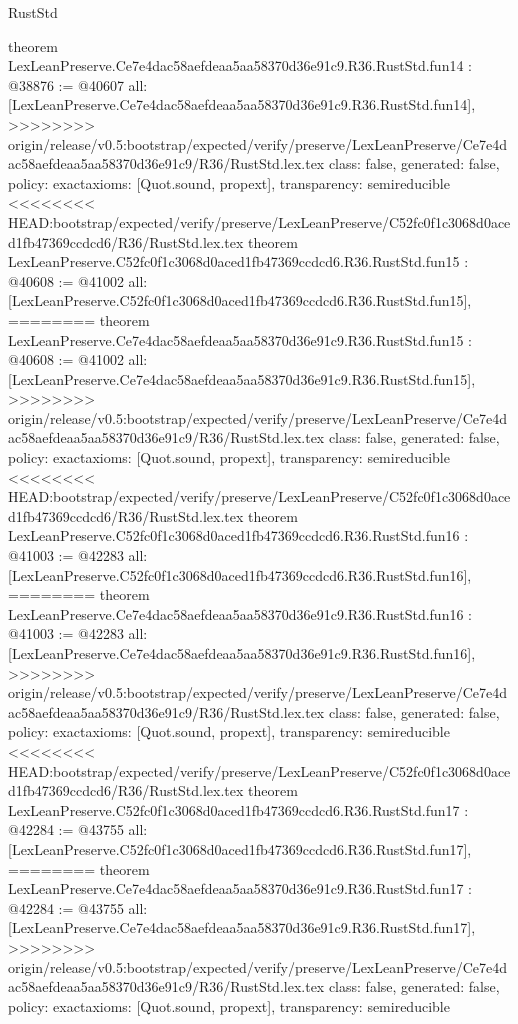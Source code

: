 \begin{lexlean}{RustStd}
\begin{coremodule}
{\begin{coremodule}
{{{{{{{{{{{{{{{{{theorem LexLeanPreserve.Ce7e4dac58aefdeaa5aa58370d36e91c9.R36.RustStd.fun14 : @38876 := @40607 {
  all: [LexLeanPreserve.Ce7e4dac58aefdeaa5aa58370d36e91c9.R36.RustStd.fun14],
>>>>>>>> origin/release/v0.5:bootstrap/expected/verify/preserve/LexLeanPreserve/Ce7e4dac58aefdeaa5aa58370d36e91c9/R36/RustStd.lex.tex
  class: false,
  generated: false,
  policy: exact{axioms: [Quot.sound, propext]},
  transparency: semireducible
}
<<<<<<<< HEAD:bootstrap/expected/verify/preserve/LexLeanPreserve/C52fc0f1c3068d0aced1fb47369ccdcd6/R36/RustStd.lex.tex
theorem LexLeanPreserve.C52fc0f1c3068d0aced1fb47369ccdcd6.R36.RustStd.fun15 : @40608 := @41002 {
  all: [LexLeanPreserve.C52fc0f1c3068d0aced1fb47369ccdcd6.R36.RustStd.fun15],
========
theorem LexLeanPreserve.Ce7e4dac58aefdeaa5aa58370d36e91c9.R36.RustStd.fun15 : @40608 := @41002 {
  all: [LexLeanPreserve.Ce7e4dac58aefdeaa5aa58370d36e91c9.R36.RustStd.fun15],
>>>>>>>> origin/release/v0.5:bootstrap/expected/verify/preserve/LexLeanPreserve/Ce7e4dac58aefdeaa5aa58370d36e91c9/R36/RustStd.lex.tex
  class: false,
  generated: false,
  policy: exact{axioms: [Quot.sound, propext]},
  transparency: semireducible
}
<<<<<<<< HEAD:bootstrap/expected/verify/preserve/LexLeanPreserve/C52fc0f1c3068d0aced1fb47369ccdcd6/R36/RustStd.lex.tex
theorem LexLeanPreserve.C52fc0f1c3068d0aced1fb47369ccdcd6.R36.RustStd.fun16 : @41003 := @42283 {
  all: [LexLeanPreserve.C52fc0f1c3068d0aced1fb47369ccdcd6.R36.RustStd.fun16],
========
theorem LexLeanPreserve.Ce7e4dac58aefdeaa5aa58370d36e91c9.R36.RustStd.fun16 : @41003 := @42283 {
  all: [LexLeanPreserve.Ce7e4dac58aefdeaa5aa58370d36e91c9.R36.RustStd.fun16],
>>>>>>>> origin/release/v0.5:bootstrap/expected/verify/preserve/LexLeanPreserve/Ce7e4dac58aefdeaa5aa58370d36e91c9/R36/RustStd.lex.tex
  class: false,
  generated: false,
  policy: exact{axioms: [Quot.sound, propext]},
  transparency: semireducible
}
<<<<<<<< HEAD:bootstrap/expected/verify/preserve/LexLeanPreserve/C52fc0f1c3068d0aced1fb47369ccdcd6/R36/RustStd.lex.tex
theorem LexLeanPreserve.C52fc0f1c3068d0aced1fb47369ccdcd6.R36.RustStd.fun17 : @42284 := @43755 {
  all: [LexLeanPreserve.C52fc0f1c3068d0aced1fb47369ccdcd6.R36.RustStd.fun17],
========
theorem LexLeanPreserve.Ce7e4dac58aefdeaa5aa58370d36e91c9.R36.RustStd.fun17 : @42284 := @43755 {
  all: [LexLeanPreserve.Ce7e4dac58aefdeaa5aa58370d36e91c9.R36.RustStd.fun17],
>>>>>>>> origin/release/v0.5:bootstrap/expected/verify/preserve/LexLeanPreserve/Ce7e4dac58aefdeaa5aa58370d36e91c9/R36/RustStd.lex.tex
  class: false,
  generated: false,
  policy: exact{axioms: [Quot.sound, propext]},
  transparency: semireducible
}}}}}}}}}}}}}}}}}}}}}
\end{coremodule}}
\end{coremodule}
\end{lexlean}
